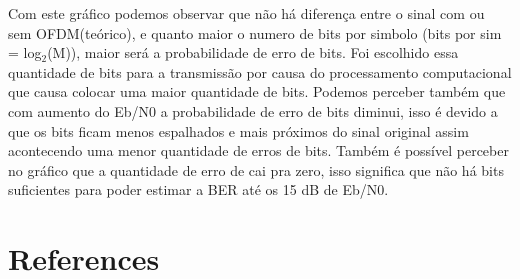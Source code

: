\documentclass[12pt]{article}
\begin{document}
Com este gráfico podemos observar que não há diferença entre o sinal com ou sem OFDM(teórico), e quanto maior o numero de bits por simbolo (bits por sim = log$_{2}$(M)), maior será a probabilidade de erro de bits. Foi escolhido essa quantidade de bits para a transmissão por causa do processamento computacional que causa colocar uma maior quantidade de bits. Podemos perceber também que com aumento do Eb/N0 a probabilidade de erro de bits diminui, isso é devido a que os bits ficam menos espalhados e mais próximos  do sinal original assim acontecendo uma menor quantidade de erros de bits. Também é possível perceber no gráfico que a quantidade de erro de cai pra zero, isso significa que não há bits suficientes para poder estimar a BER até os 15 dB de Eb/N0.




\section{References}
\cite{proakis:11}



\end{document}
